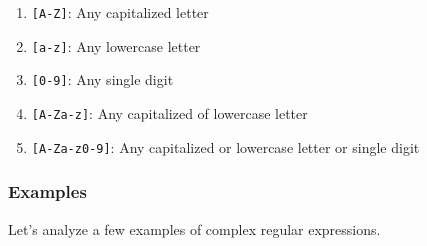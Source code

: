 \documentclass[
  letterpaper,
  DIV=11,
  numbers=noendperiod]{scrreprt}
\providecommand{\tightlist}{%
  \setlength{\itemsep}{0pt}\setlength{\parskip}{0pt}}\usepackage{longtable,booktabs,array}
\begin{document}
\begin{enumerate}
\def\labelenumi{\arabic{enumi}.}
\tightlist
\item
  \texttt{{[}A-Z{]}}: Any capitalized letter
\item
  \texttt{{[}a-z{]}}: Any lowercase letter
\item
  \texttt{{[}0-9{]}}: Any single digit
\item
  \texttt{{[}A-Za-z{]}}: Any capitalized of lowercase letter
\item
  \texttt{{[}A-Za-z0-9{]}}: Any capitalized or lowercase letter or
  single digit
\end{enumerate}

\hypertarget{examples-1}{%
\subsubsection{Examples}\label{examples-1}}

Let's analyze a few examples of complex regular expressions.
\end{document}
